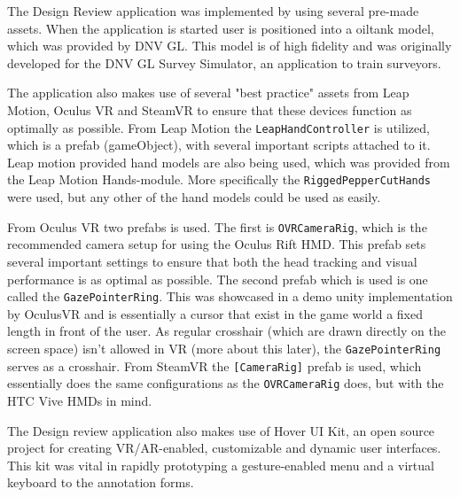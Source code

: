 The Design Review application was implemented by using several pre-made assets.
When the application is started user is positioned into a oiltank model, which was provided by DNV GL. 
This model is of high fidelity and was originally developed for the DNV GL Survey Simulator, an application to train surveyors.


The application also makes use of several "best practice" assets from Leap Motion, Oculus VR and SteamVR to ensure that these devices function
as optimally as possible. From Leap Motion the \texttt{LeapHandController} is utilized, which is a prefab (gameObject), with several important scripts attached to
it. Leap motion provided hand models are also being used, which was provided from the Leap Motion Hands-module. More specifically 
the \texttt{RiggedPepperCutHands} were used, but any other of the hand models could be used as easily.

From Oculus VR two prefabs is used. The first is \texttt{OVRCameraRig}, which is the recommended camera setup for using the Oculus Rift HMD. This 
prefab sets several important settings to ensure that both the head tracking and visual performance is as optimal as possible. The 
second prefab which is used is one called the \texttt{GazePointerRing}. This was showcased in a demo unity implementation by OculusVR
and is essentially a cursor that exist in the game world a fixed length in front of the user. As regular crosshair (which are drawn directly on the screen space)
isn't allowed in VR (more about this later), the \texttt{GazePointerRing} serves as a crosshair. 
From SteamVR the \texttt{[CameraRig]} prefab is used, which essentially does the same configurations as the \texttt{OVRCameraRig} does, but with the HTC Vive HMDs in mind.

The Design review application also makes use of Hover UI Kit, an open source project for creating VR/AR-enabled, customizable and dynamic user interfaces. 
This kit was vital in rapidly prototyping a gesture-enabled menu and a virtual keyboard to the annotation forms.